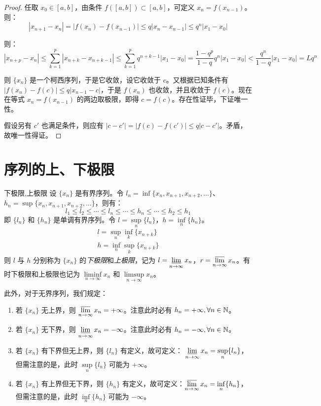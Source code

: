\begin{proof}
	任取 $x_0 \in [a, b]$，由条件 $f([a, b]) \subset [a, b]$，可定义 $x_n = f(x_{n - 1})$。则：
	$$
	|x_{n + 1} - x_n| = |f(x_n) - f(x_{n - 1})| \le q |x_n - x_{n - 1}| \le q^n |x_1 - x_0|
	$$

	则：
	$$
	|x_{n + p} - x_n| \le \sum_{k = 1}^p |x_{n + k} - x_{n + k - 1}| \le \sum_{k = 1}^p q^{n + k - 1} |x_1 - x_0| = \dfrac{1 - q^p}{1 - q} q^n |x_1 - x_0| < \dfrac{q^n}{1 - q} |x_1 - x_0| = L q^n
	$$

	则 $\{x_n\}$ 是一个柯西序列，于是它收敛，设它收敛于 $c$。又根据已知条件有 $|f(x_n) - f(c)| \le q|x_{n - 1} - c|$，于是 $f(x_n)$ 也收敛，并且收敛于 $f(c)$。现在在等式 $x_n = f(x_{n - 1})$ 的两边取极限，即得 $c = f(c)$。存在性证毕，下证唯一性。

	假设另有 $c'$ 也满足条件，则应有 $|c - c'| = |f(c) - f(c')| \le q|c - c'|$。矛盾，故唯一性得证。
\end{proof}

\section{序列的上、下极限}

\begin{definition}{下极限,上极限}
	设 $\{x_n\}$ 是有界序列。令 $l_n = \inf \{x_n, x_{n + 1}, x_{n + 2}, \ldots\}$、$h_n = \sup \{x_n, x_{n + 1}, x_{n + 2}, \ldots\}$，则有：
	$$
	l_1 \le l_2 \le \cdots \le l_n \le \cdots \le h_n \le \cdots \le h_2 \le h_1
	$$
	即 $\{l_n\}$ 和 $\{h_n\}$ 是单调有界序列。令 $l = \sup\limits_n \{l_n\}$，$h = \inf\limits_n \{h_n\}$。
	$$
	\begin{gathered}
		l = \sup\limits_n \inf\limits_k \{x_{n + k}\}
		\\
		h = \inf\limits_n \sup\limits_k \{x_{n + k}\}
	\end{gathered}
	$$
	则 $l$ 与 $h$ 分别称为 $\{x_n\}$ 的\emph{下极限}和\emph{上极限}，记为 $l = \mathop{\underline \lim}\limits_{n \rightarrow \infty} x_n$，$r = \mathop{\overline \lim}\limits_{n \rightarrow \infty} x_n$。有时下极限和上极限也记为 $\liminf\limits_{n \to \infty} x_n$ 和 $\limsup\limits_{n \to \infty} x_n$。
\end{definition}

此外，对于无界序列，我们规定：

\begin{enumerate}
	\item 若 $\{x_n\}$ 无上界，则 $\mathop{\overline \lim}\limits_{n \rightarrow \infty} x_n = + \infty$。注意此时必有 $h_n = +\infty, \forall n \in \mathbb N$。
	\item 若 $\{x_n\}$ 无下界，则 $\mathop{\underline \lim}\limits_{n \rightarrow \infty} x_n = -\infty$。注意此时必有 $h_n = -\infty, \forall n \in \mathbb N$。
	\item 若 $\{x_n\}$ 有下界但无上界，则 $\{l_n\}$ 有定义，故可定义： $\mathop{\underline \lim}\limits_{n \rightarrow \infty} x_n = \sup\limits_{n} \{l_n\}$，但需注意的是，此时 $\sup\limits_n \{l_n\}$ 可能为 $+\infty$。
	\item 若 $\{x_n\}$ 有上界但无下界，则 $\{h_n\}$ 有定义，故可定义：$\mathop{\overline \lim}\limits_{n \rightarrow \infty} x_n = \inf\limits_n\{h_n\}$，但需注意的是，此时 $\inf\limits_n\{h_n\}$ 可能为 $-\infty$。
\end{enumerate}

